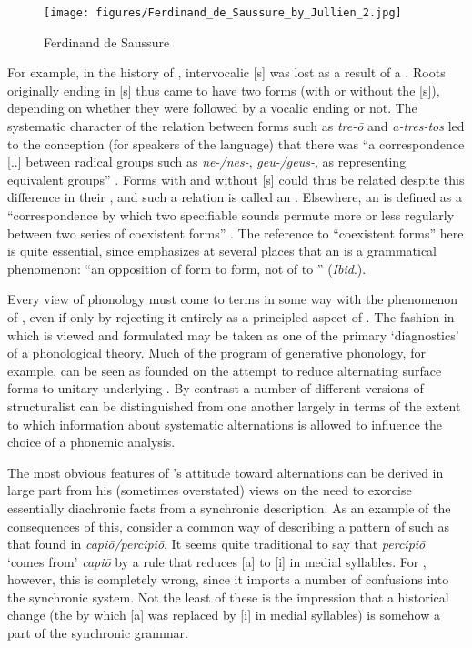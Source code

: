 \begin{wrapfigure}[17]{l}{.4\textwidth}
  \texttt{[image: figures/Ferdinand\_de\_Saussure\_by\_Jullien\_2.jpg]}
  \caption{Ferdinand de Saussure}
  \label{fig:ch.saussure_sound.saussure_2}
\end{wrapfigure}
For example, in the history of , intervocalic [s] was lost as a
result of a . Roots originally ending in [s] thus came
to have two forms (with or without the [s]), depending on whether they
were followed by a vocalic ending or not. The systematic character of
the relation between forms such as \emph{tre-ō} and \emph{a-tres-tos}
led to the conception (for speakers of the language) that there was ``a
correspondence [..] between radical groups such as \emph{ne-/nes-},
\emph{geu-/geus-}, as representing equivalent groups''
\citep[47]{reichler-beguelin80:saussure-grec-et-latin}. Forms with and
without [s] could thus be related despite this difference in their
\emph{}, and such a relation is called an
. Elsewhere, an  is defined as a ``correspondence
by which two specifiable sounds permute more or less regularly between
two series of coexistent forms'' \citep[253]{godel57:sources}. The
reference to ``coexistent forms'' here is quite essential, since
{\Saussure} emphasizes at several places that an  is a
grammatical phenomenon: ``an opposition of form to form, not of 
to '' (\emph{Ibid}.).

Every view of phonology must come to terms in some way with the
phenomenon of , even if only by rejecting it entirely as a
principled aspect of . The fashion in which 
is viewed and formulated may be taken as one of the primary
`diagnostics' of a phonological theory. Much of the program of
generative phonology, for example, can be seen as founded on the
attempt to reduce alternating surface forms to unitary underlying
. By {contrast} a number of different versions of
structuralist  can be distinguished from one another
largely in terms of the extent to which information about systematic
alternations is allowed to influence the choice of a phonemic
analysis.

The most obvious features of {\Saussure}'s attitude toward alternations
can be derived in large part from his (sometimes overstated) views on
the need to exorcise essentially diachronic facts from a synchronic
description. As an example of the consequences of this, consider a
common way of describing a pattern of  such as that found
in  \emph{capiō/percipiō}. It seems quite traditional to say that
\emph{percipiō} `comes from' \emph{capiō} by a rule that reduces [a]
to [i] in medial syllables. For {\Saussure}, however, this is completely
wrong, since it imports a number of confusions into the synchronic
system. Not the least of these is the impression that a historical
change (the  by which [a] was replaced by [i] in medial
syllables) is somehow a part of the synchronic grammar.

